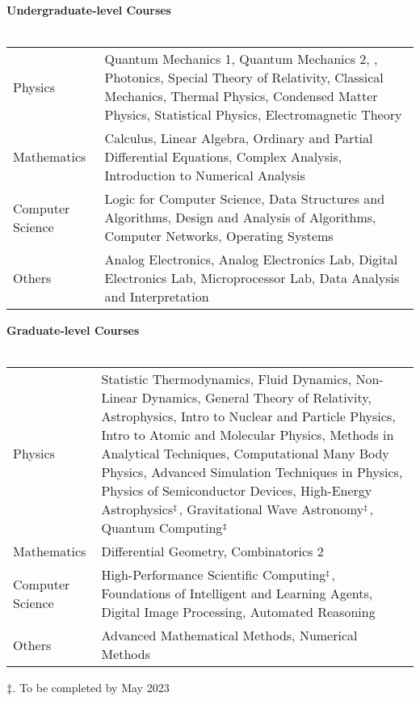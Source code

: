 \textbf{Undergraduate-level Courses} \\\\
{
\centering
\begin{tabular}{>{\raggedleft\arraybackslash}p{} p{}}

    Physics             &   Quantum Mechanics 1, Quantum Mechanics 2, , Photonics, Special Theory of Relativity, Classical Mechanics, Thermal Physics, Condensed Matter Physics, Statistical Physics, Electromagnetic Theory \B\\
    Mathematics         &   Calculus, Linear Algebra,
    Ordinary and Partial Differential Equations, Complex Analysis, Introduction to Numerical
    Analysis \T\B\\
    Computer Science    &   Logic for Computer Science, Data Structures and Algorithms, Design and Analysis of Algorithms, Computer Networks, Operating Systems \T\B\\
    Others              &   Analog Electronics, Analog Electronics Lab, Digital Electronics Lab, Microprocessor Lab, Data Analysis and Interpretation \T%

\end{tabular}
} %

\textbf{Graduate-level Courses} \\\\
{
\centering
\begin{tabular}{>{\raggedleft\arraybackslash}p{} p{}}

    Physics             &   Statistic Thermodynamics, Fluid Dynamics, Non-Linear Dynamics, General Theory of Relativity, Astrophysics, Intro to Nuclear and Particle Physics, Intro to Atomic and Molecular Physics, Methods in Analytical Techniques, Computational Many Body Physics, Advanced Simulation Techniques in Physics, Physics of Semiconductor Devices, High-Energy Astrophysics$^\ddagger$, Gravitational Wave Astronomy$^\ddagger$, Quantum Computing$^\ddagger$ \B\\
    Mathematics         &   Differential Geometry, Combinatorics 2 \T\B\\
    Computer Science    &   High-Performance Scientific Computing$^\ddagger$, Foundations of Intelligent and Learning Agents, Digital Image Processing, Automated Reasoning \T\B\\
    Others              &   Advanced Mathematical Methods, Numerical Methods \T%

\end{tabular}
} %


\begin{flushleft}
    \small
    $\ddagger$. To be completed by May 2023
\end{flushleft}